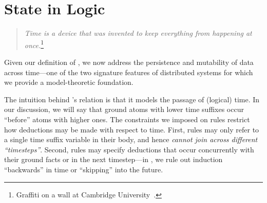 \section{State in Logic}
\label{sec:stateupdate}





\begin{quote}
%
\emph{Time is a device that was invented to keep everything from
happening at once.}\footnote{Graffiti on a wall at Cambridge
University~\cite{scheme}.}
%
\end{quote} 

Given our definition of \slang, we now address the persistence and mutability
of data across time---one of the two signature features of distributed systems
for which we provide a model-theoretic foundation.

The intuition behind \slang's  relation is that it models the
passage of (logical) time.  In our discussion, we will say that ground atoms
with lower time suffixes occur ``before'' atoms with higher ones.
The constraints we imposed on \slang rules restrict how deductions may be made
with respect to time.  First, rules may only refer to a single time suffix variable in
their body, and hence {\em cannot join across different ``timesteps''}.  Second, rules may specify
deductions that occur concurrently with their ground facts or in the next
timestep---in \slang, we rule out induction ``backwards'' in time or
``skipping'' into the future.

